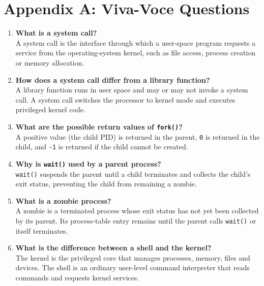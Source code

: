 \section*{Appendix A: Viva-Voce Questions}

\begin{enumerate}
    \item \textbf{What is a system call?}\\
    A system call is the interface through which a user-space program requests a service from the operating-system kernel, such as file access, process creation or memory allocation.

    \item \textbf{How does a system call differ from a library function?}\\
    A library function runs in user space and may or may not invoke a system call. A system call switches the processor to kernel mode and executes privileged kernel code.

    \item \textbf{What are the possible return values of \texttt{fork()}?}\\
    A positive value (the child PID) is returned in the parent, \texttt{0} is returned in the child, and \texttt{-1} is returned if the child cannot be created.

    \item \textbf{Why is \texttt{wait()} used by a parent process?}\\
    \texttt{wait()} suspends the parent until a child terminates and collects the child's exit status, preventing the child from remaining a zombie.

    \item \textbf{What is a zombie process?}\\
    A zombie is a terminated process whose exit status has not yet been collected by its parent. Its process-table entry remains until the parent calls \texttt{wait()} or itself terminates.

    \item \textbf{What is the difference between a shell and the kernel?}\\
    The kernel is the privileged core that manages processes, memory, files and devices. The shell is an ordinary user-level command interpreter that reads commands and requests kernel services.


\end{enumerate}
